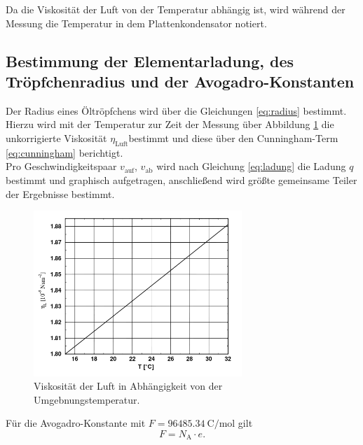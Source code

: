Da die Viskosität der Luft von der Temperatur abhängig ist,
wird während der Messung  die Temperatur in dem Plattenkondensator notiert.

\subsection{Bestimmung der Elementarladung, des Tröpfchenradius und der Avogadro-Konstanten}
Der Radius eines Öltröpfchens wird über die Gleichungen \eqref{eq:radius} bestimmt.
Hierzu wird mit der Temperatur zur Zeit der Messung über Abbildung 
\ref{fig:temp} die unkorrigierte Viskosität $\eta_\text{Luft}$bestimmt und diese über den Cunningham-Term \eqref{eq:cunningham}
berichtigt.\\
Pro Geschwindigkeitspaar $v_\text{auf}$, $v_\text{ab}$  wird nach Gleichung \eqref{eq:ladung} die Ladung $q$ bestimmt und  graphisch aufgetragen, anschließend wird größte gemeinsame Teiler der Ergebnisse bestimmt.

\begin{figure}[h]
	\centering
	\includegraphics[width=0.7\textwidth]{Bilder/Temp.png}
	\caption{Viskosität der Luft in Abhängigkeit von der Umgebnungstemperatur. \cite{skript}}
	\label{fig:temp}
\end{figure}

Für die Avogadro-Konstante mit $F=\SI{96485.34}{\coulomb\per\mol}$ gilt
\begin{equation}
	F=N_\text{A}\cdot e.
\end{equation}